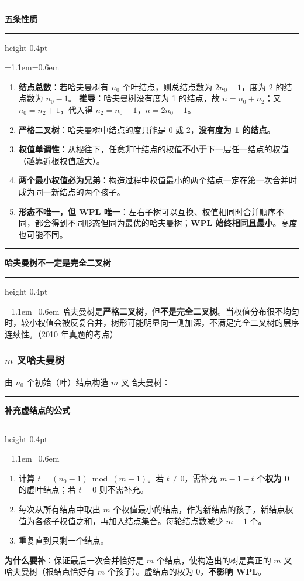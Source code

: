 \documentclass[11pt,openany,UTF8]{ctexbook}
\newcommand{\callouthead}[2]{%
  \par\addvspace{7pt}\noindent
  {\color{#1}\rule[-0.15em]{3pt}{1.05em}}\hspace{0.5em}%
  {\bfseries\color{#1}#2}\par\nobreak\vspace{-0.35em}%
  {\color{rulesep}\hrule height 0.4pt}\nobreak\vspace{0.45em}%
  \begingroup\small\setlength{\parindent}{0pt}%
  \leftskip=1.1em\rightskip=0.6em\noindent\ignorespaces}
\newcommand{\calloutend}{\par\endgroup\addvspace{7pt}}
\newenvironment{callkey}[1]{\callouthead{keybar}{#1}}{\calloutend}
\begin{document}
\begin{callkey}{五条性质}
\begin{enumerate}
\item \textbf{结点总数}：若哈夫曼树有 $n_0$ 个叶结点，则总结点数为 $2n_0-1$，度为 2 的结点数为 $n_0-1$。 \textbf{推导}：哈夫曼树没有度为 1 的结点，故 $n=n_0+n_2$；又 $n_0=n_2+1$，代入得 $n_2=n_0-1$，$n=2n_0-1$。
\item \textbf{严格二叉树}：哈夫曼树中结点的度只能是 0 或 2，\textbf{没有度为 1 的结点}。
\item \textbf{权值单调性}：从根往下，任意非叶结点的权值\textbf{不小于}下一层任一结点的权值（越靠近根权值越大）。
\item \textbf{两个最小权值必为兄弟}：构造过程中权值最小的两个结点一定在第一次合并时成为同一新结点的两个孩子。
\item \textbf{形态不唯一，但 WPL 唯一}：左右子树可以互换、权值相同时合并顺序不同，都会得到不同形态但同为最优的哈夫曼树；\textbf{WPL 始终相同且最小}。高度也可能不同。
\end{enumerate}
\end{callkey}

\begin{callkey}{哈夫曼树不一定是完全二叉树}
哈夫曼树是\textbf{严格二叉树}，但\textbf{不是完全二叉树}。当权值分布很不均匀时，较小权值会被反复合并，树形可能明显向一侧加深，不满足完全二叉树的层序连续性。（2010 年真题的考点）

\end{callkey}

\subsubsection{$m$ 叉哈夫曼树}

由 $n_0$ 个初始（叶）结点构造 $m$ 叉哈夫曼树：

\begin{callkey}{补充虚结点的公式}
\begin{enumerate}
\item 计算 $t=(n_0-1)\bmod(m-1)$。若 $t\ne0$，需补充 $m-1-t$ 个\textbf{权为 0} 的虚叶结点；若 $t=0$ 则不需补充。
\item 每次从所有结点中取出 $m$ 个权值最小的结点，作为新结点的孩子，新结点权值为各孩子权值之和，再加入结点集合。每轮结点数减少 $m-1$ 个。
\item 重复直到只剩一个结点。
\end{enumerate}
\textbf{为什么要补}：保证最后一次合并恰好是 $m$ 个结点，使构造出的树是真正的 $m$ 叉哈夫曼树（根结点恰好有 $m$ 个孩子）。虚结点的权为 0，\textbf{不影响 WPL}。

\end{callkey}
\end{document}
